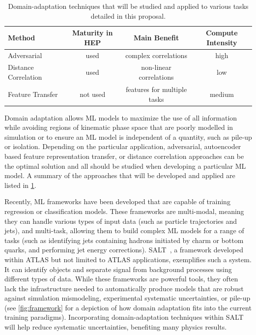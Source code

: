 \documentclass[letter, USenglish, 11pt, subfigure]{article}
\begin{document}
\begin{table}
  \caption{\label{tab:methods}Domain-adaptation techniques that will be studied and applied to various tasks detailed in this proposal. }
  \begin{tabular}{|l|c|c|c|} \hline
    {\bf Method} & {\bf Maturity in HEP} & {\bf Main Benefit} & {\bf Compute Intensity} \\  \hline\hline 
    Adversarial & used & complex correlations & high \\ \hline
    Distance Correlation & used & non-linear correlations & low \\ \hline
    Feature Transfer & not used & features for multiple tasks  & medium \\ \hline\hline                                                                                                                                       
  \end{tabular}
\end{table}

Domain adaptation allows ML models to maximize the use of all information while avoiding regions of kinematic phase space that are poorly modelled in simulation or to ensure an ML model is independent of a quantity, such as pile-up or isolation. Depending on the particular application, adversarial, autoencoder based feature representation transfer, or distance correlation approaches can be the optimal solution and all should be studied when developing a particular ML model. A summary of the approaches that will be developed and applied are listed in \cref{tab:methods}.

Recently, ML frameworks have been developed that are capable of training regression or classification models. These frameworks are multi-modal, meaning they can handle various types of input data (such as particle trajectories and jets), and multi-task, allowing them to build complex ML models for a range of tasks (such as identifying jets containing hadrons initiated by charm or bottom quarks, and performing jet energy corrections). SALT~\cite{salt}, a framework developed within ATLAS but not limited to ATLAS applications, exemplifies such a system. It can identify objects and separate signal from background processes using different types of data. While these frameworks are powerful tools, they often lack the infrastructure needed to automatically produce models that are robust against simulation mismodeling, experimental systematic uncertainties, or pile-up (see \cref{fig:framework} for a depiction of how domain adaptation fits into the current training paradigms). Incorporating domain-adaptation techniques within SALT will help reduce systematic uncertainties, benefiting many physics results. %
\end{document}
